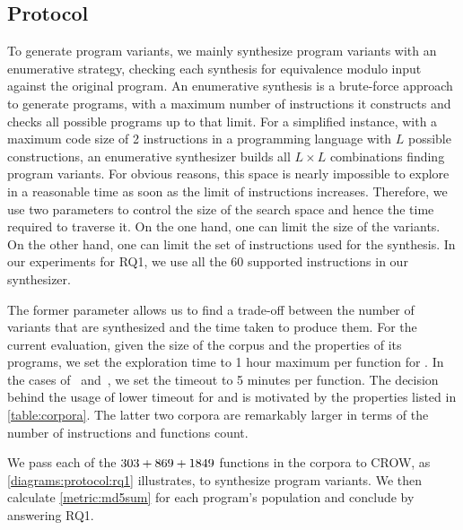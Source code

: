\subsection{Protocol}

To generate program variants, we mainly synthesize program variants with an enumerative strategy, checking each synthesis for equivalence modulo input \cite{Li2018} against the original program. An enumerative synthesis is a brute-force approach to generate programs, with a maximum number of instructions it constructs and checks all possible programs up to that limit. For a simplified instance, with a maximum code size of 2 instructions in a programming language with $L$ possible constructions, an enumerative synthesizer builds all $L\times L$ combinations finding program variants. For obvious reasons, this space is nearly impossible to explore in a reasonable time as soon as the limit of instructions increases.
Therefore, we use two parameters to control the size of the search space and hence the time required to traverse it.
On the one hand, one can limit the size of the variants. On the other hand, one can limit the set of instructions used for the synthesis. In our experiments for RQ1, we use all the $60$ supported instructions in our synthesizer.

The former parameter allows us to find a trade-off between the number of variants that are synthesized and the time taken to produce them. For the current evaluation, given the size of the corpus and the properties of its programs, we set the exploration time to 1 hour maximum per function for \corpusrosetta. In the cases of \corpussodium\ and\ \corpusqrcode, we set the timeout to 5 minutes per function. The decision behind the usage of lower timeout for \corpussodium
and \corpussodium is motivated by the properties listed in \autoref{table:corpora}. The latter two corpora are remarkably larger in terms of the number of instructions and functions count. 

We pass each of the $303 + 869 + 1849$ functions in the corpora to CROW, as \autoref{diagrams:protocol:rq1} illustrates, to synthesize program variants. We then calculate \autoref{metric:md5sum} for each program's population and conclude by answering RQ1.
